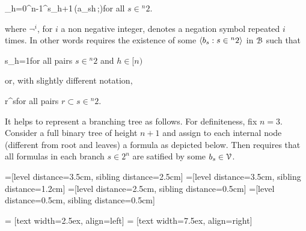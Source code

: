\documentclass[scombinatorics.tex]{subfiles}
\begin{document}
{\neq}
{\bigcap_{h=0}^{n-1}\neg^{s_h+1}\,\phi(a_{s\restriction h}\,;\B)}\hfill for all $s\in {}^n2$.

where $\neg^i$, for $i$ a non negative integer, denotes a negation symbol repeated $i$ times.
In other words  requires the existence of some $\langle b_s:s\in{}^n2\rangle$ in $\EuScript B$ such that

{\IFF}
{s_h=1}\hfill for all pairs $s\in {}^n2$ and $h\in[n)$

or, with slightly different notation,

{\IFF}
{r^\subseteq s}\hfill for all pairs $r\subset s\in {}^n2$.

It helps to represent a branching tree as follows.
For definiteness, fix $n=3$.
Consider a full binary tree of height $n+1$ and assign to each internal node (different from root and leaves) a formula as depicted below.
Then  requires that all formulas in each branch $s\in2^n$ are satified by some $b_s\in\EuScript V$.
\medskip

=[level distance=3.5cm, sibling distance=2.5cm]
=[level distance=3.5cm, sibling distance=1.2cm]
=[level distance=2.5cm, sibling distance=0.5cm]
=[level distance=0.5cm, sibling distance=0.5cm]

 = [text width=2.5ex, align=left]
 = [text width=7.5ex, align=right]
\end{document}
